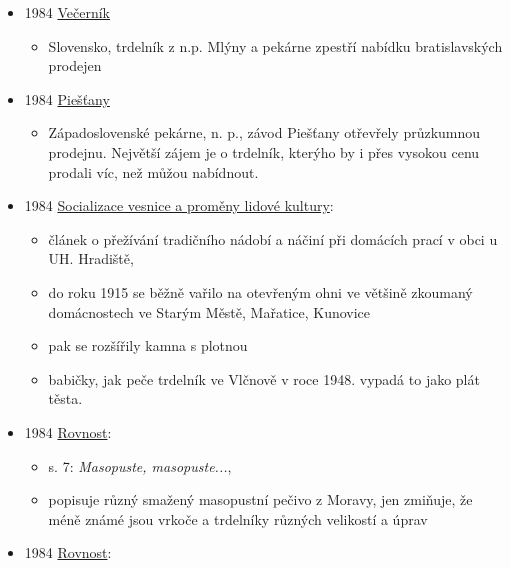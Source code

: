 \begin{itemize}
  \begin{itemize}
  \tightlist
  \item
    Slovensko, Západoslovenské pekárne, n. p. Piešťany získaly za
    trdelník VHJ (netuším co to je) na výstavě Agrokomplex 84 za mlýnský
    a pekárenský průmysl
  \end{itemize}
\item
  1984
  \href{https://dikda.snk.sk/uuid/uuid:a8b9dc68-bf2f-4a1c-93e9-81f3cff1ab98}{Večerník}

  \begin{itemize}
  \tightlist
  \item
    Slovensko, trdelník z n.p. Mlýny a pekárne zpestří nabídku
    bratislavských prodejen
  \end{itemize}
\item
  1984
  \href{https://dikda.snk.sk/uuid/uuid:de963c61-5ac8-4073-8c7c-12d5370aa4f0}{Piešťany}

  \begin{itemize}
  \tightlist
  \item
    Západoslovenské pekárne, n. p., závod Piešťany otřevřely průzkumnou
    prodejnu. Největší zájem je o trdelník, kterýho by i přes vysokou
    cenu prodali víc, než můžou nabídnout.
  \end{itemize}
\item
  1984
  \href{https://ceskadigitalniknihovna.cz/uuid/uuid:065a3d70-f844-11e5-92c7-5ef3fc9ae867}{Socializace
  vesnice a proměny lidové kultury}:

  \begin{itemize}
  \tightlist
  \item
    článek o přežívání tradičního nádobí a náčiní při domácích prací v
    obci u UH. Hradiště, 
  \item
    do roku 1915 se běžně vařilo na otevřeným ohni ve většině zkoumaný
    domácnostech ve Starým Městě, Mařatice, Kunovice
  \item
    pak se rozšířily kamna s plotnou
  \item
     babičky, jak peče trdelník ve Vlčnově
     v roce 1948. vypadá to jako plát těsta.
  \end{itemize}
\item
  1984
  \href{https://ndk.cz/uuid/uuid:831adb20-0cb3-11f0-9e41-5ef3fc9bb22f}{Rovnost}:

  \begin{itemize}
  \tightlist
  \item
    s. 7: \emph{Masopuste, masopuste...}, 
  \item
    popisuje různý smažený masopustní pečivo z Moravy, jen zmiňuje, že
    méně známé jsou vrkoče a trdelníky různých velikostí a úprav
  \end{itemize}
\item
  1984
  \href{https://ceskadigitalniknihovna.cz/uuid/uuid:0571ff20-0cbb-11f0-9e41-5ef3fc9bb22f}{Rovnost}:


\end{itemize}
